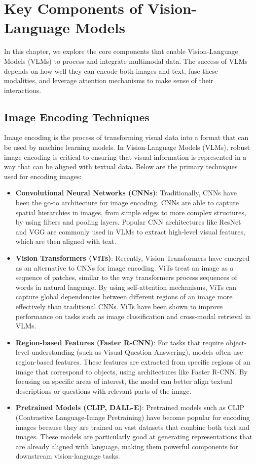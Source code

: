 \chapter{Key Components of Vision-Language Models}

In this chapter, we explore the core components that enable Vision-Language Models (VLMs) to process and integrate multimodal data. The success of VLMs depends on how well they can encode both images and text, fuse these modalities, and leverage attention mechanisms to make sense of their interactions.

\section{Image Encoding Techniques}

Image encoding is the process of transforming visual data into a format that can be used by machine learning models. In Vision-Language Models (VLMs), robust image encoding is critical to ensuring that visual information is represented in a way that can be aligned with textual data. Below are the primary techniques used for encoding images:

\begin{itemize}
    \item \textbf{Convolutional Neural Networks (CNNs)}: Traditionally, CNNs have been the go-to architecture for image encoding. CNNs are able to capture spatial hierarchies in images, from simple edges to more complex structures, by using filters and pooling layers. Popular CNN architectures like ResNet and VGG are commonly used in VLMs to extract high-level visual features, which are then aligned with text.
    \item \textbf{Vision Transformers (ViTs)}: Recently, Vision Transformers have emerged as an alternative to CNNs for image encoding. ViTs treat an image as a sequence of patches, similar to the way transformers process sequences of words in natural language. By using self-attention mechanisms, ViTs can capture global dependencies between different regions of an image more effectively than traditional CNNs. ViTs have been shown to improve performance on tasks such as image classification and cross-modal retrieval in VLMs.
    \item \textbf{Region-based Features (Faster R-CNN)}: For tasks that require object-level understanding (such as Visual Question Answering), models often use region-based features. These features are extracted from specific regions of an image that correspond to objects, using architectures like Faster R-CNN. By focusing on specific areas of interest, the model can better align textual descriptions or questions with relevant parts of the image.
    \item \textbf{Pretrained Models (CLIP, DALL-E)}: Pretrained models such as CLIP (Contrastive Language-Image Pretraining) have become popular for encoding images because they are trained on vast datasets that combine both text and images. These models are particularly good at generating representations that are already aligned with language, making them powerful components for downstream vision-language tasks.
\end{itemize}

